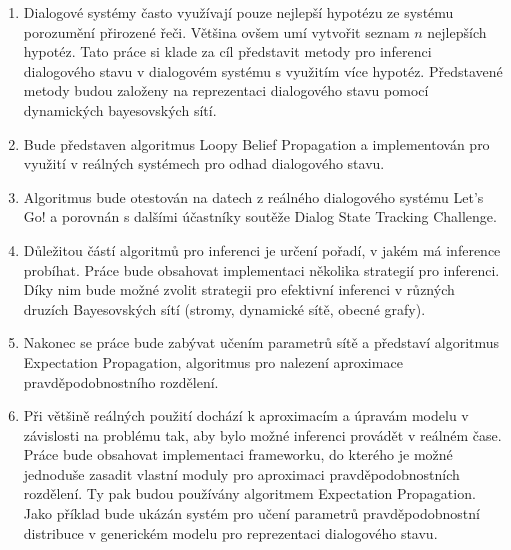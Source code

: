 \begin{enumerate}
\item Dialogové systémy často využívají pouze nejlepší hypotézu ze systému porozumění přirozené řeči.
    Většina ovšem umí vytvořit seznam $n$ nejlepších hypotéz.
    Tato práce si klade za cíl představit metody pro inferenci dialogového stavu v dialogovém systému s využitím více hypotéz.
    Představené metody budou založeny na reprezentaci dialogového stavu pomocí dynamických bayesovských sítí.
\item Bude představen algoritmus Loopy Belief Propagation a implementován pro využití v reálných systémech pro odhad dialogového stavu.
\item Algoritmus bude otestován na datech z reálného dialogového systému Let's Go! a porovnán s dalšími účastníky soutěže Dialog State Tracking Challenge.
\item Důležitou částí algoritmů pro inferenci je určení pořadí, v jakém má inference probíhat.
    Práce bude obsahovat implementaci několika strategií pro inferenci. Díky nim bude možné zvolit strategii pro efektivní inferenci v různých druzích Bayesovských sítí (stromy, dynamické sítě, obecné grafy).
\item Nakonec se práce bude zabývat učením parametrů sítě a představí algoritmus Expectation Propagation, algoritmus pro nalezení aproximace pravděpodobnostního rozdělení.
\item Při většině reálných použití dochází k aproximacím a úpravám modelu v závislosti na problému tak, aby bylo možné inferenci provádět v reálném čase.
Práce bude obsahovat implementaci frameworku, do kterého je možné jednoduše zasadit vlastní moduly pro aproximaci pravděpodobnostních rozdělení.
Ty pak budou používány algoritmem Expectation Propagation.
Jako příklad bude ukázán systém pro učení parametrů pravděpodobnostní distribuce v generickém modelu pro reprezentaci dialogového stavu.
\end{enumerate}
